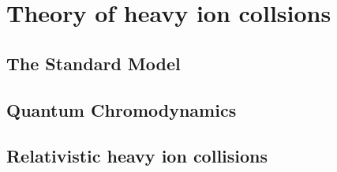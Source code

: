 \chapter{Theory of heavy ion collsions}
  \section{The Standard Model}
  \section{Quantum Chromodynamics}
  \section{Relativistic heavy ion collisions}
